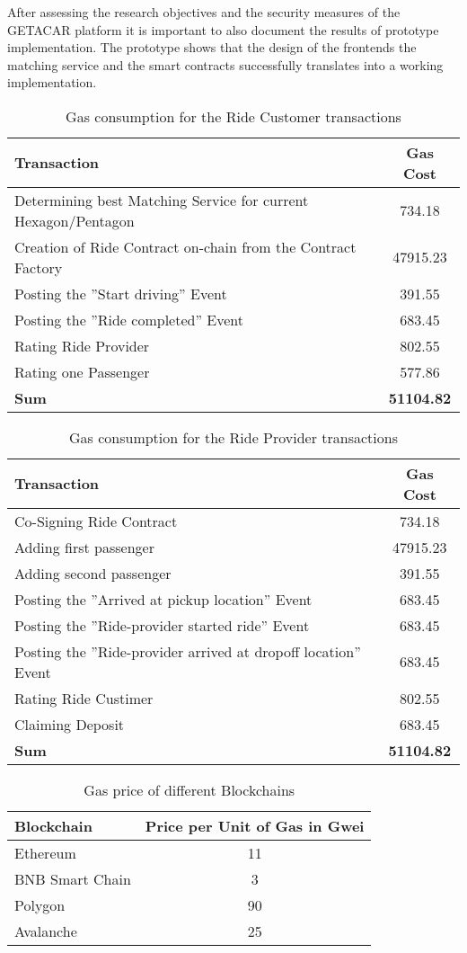 After assessing  the research objectives and the security measures of the GETACAR platform it is important to also document the results of prototype implementation. 
The prototype shows that the design of the frontends the matching service and the smart contracts successfully translates into a working implementation. 




\begin{table}[h]
\centering
\begin{tabular}{|l|c|}
\hline
\textbf{Transaction} & \textbf{Gas Cost} \\
\hline
Determining best Matching Service for current Hexagon/Pentagon & 734.18 \\
\hline
Creation of Ride Contract on-chain from the Contract Factory& 47915.23 \\
\hline
Posting the ''Start driving'' Event& 391.55 \\
\hline
Posting the ''Ride completed'' Event & 683.45 \\
\hline
Rating Ride Provider & 802.55 \\
\hline
Rating one Passenger & 577.86 \\
\hline
\hline
\textbf{Sum}  & \textbf{51104.82} \\
\hline
\end{tabular}
\caption{Gas consumption for the Ride Customer transactions}
\end{table}



\begin{table}[h]
\centering
\begin{tabular}{|l|c|}
\hline
\textbf{Transaction} & \textbf{Gas Cost} \\
\hline
Co-Signing Ride Contract & 734.18 \\
\hline
Adding first passenger  & 47915.23 \\
\hline
Adding second passenger & 391.55 \\
\hline
Posting the ''Arrived at pickup location'' Event & 683.45 \\
\hline
Posting the ''Ride-provider started ride'' Event & 683.45 \\
\hline
Posting the ''Ride-provider arrived at dropoff location'' Event & 683.45 \\
\hline
Rating Ride Custimer & 802.55 \\
\hline
Claiming Deposit & 683.45 \\
\hline
\hline
\textbf{Sum}  & \textbf{51104.82} \\
\hline
\end{tabular}
\caption{Gas consumption for the Ride Provider transactions}
\end{table}


\begin{table}
\centering
\begin{tabular}{|l|c|}
\hline
\textbf{Blockchain} & \textbf{Price per Unit of Gas in Gwei}\\
\hline
Ethereum & 11 \\
\hline
BNB Smart Chain & 3 \\
\hline
Polygon & 90 \\
\hline
Avalanche & 25 \\
\hline
\end{tabular}
\caption{Gas price of different Blockchains}
\end{table}
